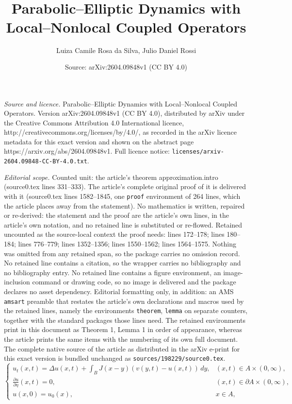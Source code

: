 \documentclass[10pt,a4paper]{amsart}
\title{Parabolic--Elliptic Dynamics with Local--Nonlocal Coupled Operators}
\author{Luiza Camile Rosa da Silva, Julio Daniel Rossi}
\date{Source: arXiv:2604.09848v1 (CC BY 4.0)}
\begin{document}
\maketitle

\noindent\emph{Source and licence.} Parabolic--Elliptic Dynamics with Local--Nonlocal Coupled Operators. Version arXiv:2604.09848v1 (CC BY 4.0), distributed by arXiv under the Creative Commons Attribution 4.0 International licence, http://creativecommons.org/licenses/by/4.0/, as recorded in the arXiv licence metadata for this exact version and shown on the abstract page https://arxiv.org/abs/2604.09848v1. Full licence notice: \texttt{licenses/arxiv-2604.09848-CC-BY-4.0.txt}.\par\smallskip

\noindent\textit{Editorial scope.} Counted unit: the article's theorem approximation.intro (source0.tex lines 331--333). The article's complete original proof of it is delivered with it (source0.tex lines 1582--1845, one \texttt{proof} environment of 264 lines, which the article places away from the statement). No mathematics is written, repaired or re-derived: the statement and the proof are the article's own lines, in the article's own notation, and no retained line is substituted or re-flowed.  Retained uncounted as the source-local context the proof needs: lines 172--178; lines 180--184; lines 776--779; lines 1352--1356; lines 1550--1562; lines 1564--1575.  Nothing was omitted from any retained span, so the package carries no omission record.  No retained line contains a citation, so the wrapper carries no bibliography and no bibliography entry.  No retained line contains a figure environment, an image-inclusion command or drawing code, so no image is delivered and the package declares no asset dependency.  Editorial formatting only, in addition: an AMS \texttt{amsart} preamble that restates the article's own declarations and macros used by the retained lines, namely the environments \texttt{theorem}, \texttt{lemma} on separate counters, together with the standard packages those lines need.  The retained environments print in this document as Theorem 1, Lemma 1 in order of appearance, whereas the article prints the same items with the numbering of its own full document.  The complete native source of the article as distributed in the arXiv e-print for this exact version is bundled unchanged as \texttt{sources/198229/source0.tex}.
\begin{equation}\label{localpar}
\begin{cases}
    \displaystyle u_t(x,t)=\Delta u(x,t)+ \int_B J(x-y)(v(y,t)-u(x,t))\,dy, &  (x,t)\in A\times (0,\infty),  \\
    \displaystyle \frac{\partial u}{\partial \eta}(x,t)=0, & (x,t)\in \partial A \times (0,\infty),\\
    u(x,0)=u_0(x), & x\in A,
\end{cases}
\end{equation}
\end{document}

